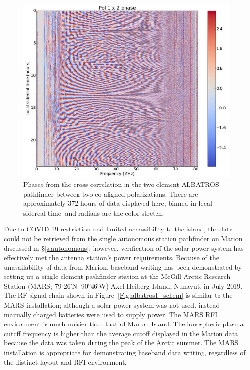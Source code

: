 \begin{figure}
	\centering
	\includegraphics[width=0.7\linewidth]{Figures/pol1}
	\caption{Phases from the cross-correlation in the two-element ALBATROS pathfinder between two co-aligned polarizations. There are approximately 372 hours of data displayed here, binned in local sidereal time, and radians are the color stretch.}
	\label{Fig:pol1}
\end{figure}

Due to COVID-19 restriction and limited accessibility to the island, the data could not be retrieved from the single autonomous station pathfinder on Marion discussed in \S\ref{s:autonomous}; however, verification of the solar power system has effectively met the antenna station's power requirements. Because of the unavailability of data from Marion, baseband writing has been demonstrated by setting up a single-element pathfinder station at the McGill Arctic Research Station (MARS; \ang{79;26;}N, \ang{90;46;}W) Axel Heiberg Island, Nunavut, in July 2019. The RF signal chain shown in Figure~\ref{Fig:albatros1_schem} is similar to the MARS installation; although a solar power system was not used, instead manually charged batteries were used to supply power. The MARS RFI environment is much noisier than that of Marion Island. The ionospheric plasma cutoff frequency is higher than the average cutoff displayed in the Marion data because the data was taken during the peak of the Arctic summer. The MARS installation is appropriate for demonstrating baseband data writing, regardless of the distinct layout and RFI environment. 

